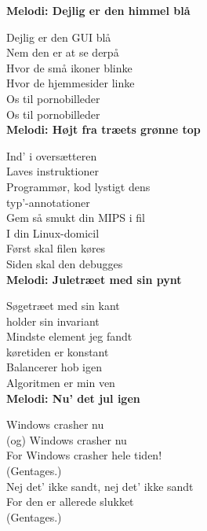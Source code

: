 \vspace{-3mm}

\vspace{-1.5mm}
\textbf{Melodi: Dejlig er den himmel blå}

Dejlig er den GUI blå\\
Nem den er at se derpå\\
Hvor de små ikoner blinke\\
Hvor de hjemmesider linke\\
Os til pornobilleder\\
Os til pornobilleder\\


\vspace{-1.5mm}
\textbf{Melodi: Højt fra træets grønne top}

Ind' i oversætteren\\
Laves instruktioner\\
Programmør, kod lystigt dens\\
typ'-annotationer\\
Gem så smukt din MIPS i fil\\
I din Linux-domicil\\
Først skal filen køres\\
Siden skal den debugges\\


\vspace{-1.5mm}
\textbf{Melodi: Juletræet med sin pynt}

Søgetræet med sin kant\\
holder sin invariant\\
Mindste element jeg fandt\\
køretiden er konstant\\
Balancerer hob igen\\
Algoritmen er min ven\\


\vspace{-1.5mm}
\textbf{Melodi: Nu' det jul igen}

Windows crasher nu\\
(og) Windows crasher nu\\
For Windows crasher hele tiden!\\
(Gentages.)\\
Nej det' ikke sandt, nej det' ikke sandt\\
For den er allerede slukket\\
(Gentages.)
